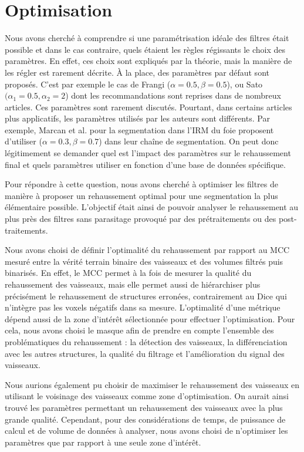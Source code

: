 \section{Optimisation}

Nous avons cherché à comprendre si une paramétrisation idéale des filtres était possible et dans le cas contraire, quels étaient les règles régissants le choix des paramètres. En effet, ces choix sont expliqués par la théorie, mais la manière de les régler est rarement décrite. À la place, des paramètres par défaut sont proposés. C'est par exemple le cas de Frangi ($\alpha=0.5,\beta=0.5$), ou Sato $(\alpha_1=0.5,\alpha_2=2$) dont les recommandations sont reprises dans de nombreux articles. Ces paramètres sont rarement discutés. Pourtant, dans certains articles plus applicatifs, les paramètres utilisés par les auteurs sont différents. Par exemple, Marcan et al. \cite{Marcan2014_vessel_seg} pour la segmentation dans l'IRM du foie proposent d'utiliser ($\alpha=0.3,\beta=0.7$) dans leur chaîne de segmentation. On peut donc légitimement se demander quel est l'impact des paramètres sur le rehaussement final et quels paramètres utiliser en fonction d'une base de données spécifique.

Pour répondre à cette question, nous avons cherché à optimiser les filtres de manière à proposer un rehaussement optimal pour une segmentation la plus élémentaire possible. L'objectif était ainsi de pouvoir analyser le rehaussement au plus près des filtres sans parasitage provoqué par des prétraitements ou des post-traitements.

Nous avons choisi de définir l'optimalité du rehaussement par rapport au MCC mesuré entre la vérité terrain binaire des vaisseaux et des volumes filtrés puis binarisés. En effet, le MCC permet à la fois de mesurer la qualité du rehaussement des vaisseaux, mais elle permet aussi de hiérarchiser plus précisément le rehaussement de structures erronées, contrairement au Dice qui n'intègre pas les voxels négatifs dans sa mesure. L'optimalité d'une métrique dépend aussi de la zone d'intérêt sélectionnée pour effectuer l'optimisation. Pour cela, nous avons choisi le masque \maskglobal afin de prendre en compte l'ensemble des problématiques du rehaussement : la détection des vaisseaux, la  différenciation avec les autres structures, la qualité du filtrage et l'amélioration du signal des vaisseaux. 

Nous aurions également pu choisir de maximiser le rehaussement des vaisseaux en utilisant le voisinage des vaisseaux comme zone d'optimisation. On aurait ainsi trouvé les paramètres permettant un rehaussement des vaisseaux avec la plus grande qualité. Cependant, pour des considérations de temps, de puissance de calcul et de volume de données à analyser, nous avons choisi de n'optimiser les paramètres que par rapport à une seule zone d'intérêt.

